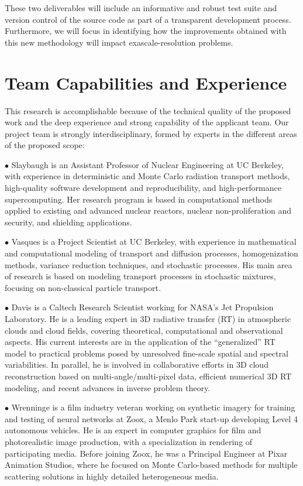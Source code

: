 \documentclass[12pt]{article}
\begin{document}
These two deliverables will include an informative and robust test suite and version control of the source code as part of a transparent development process.
Furthermore, we will focus in identifying how the improvements obtained with this new methodology will impact exascale-resolution problems.


\section{Team Capabilities and Experience}

This research is accomplishable because of the technical quality of the proposed work and the deep experience and strong capability of the applicant team.
Our project team is strongly interdisciplinary, formed by experts in the different areas of the proposed scope:

$\bullet$ Slaybaugh is an Assistant Professor of Nuclear Engineering at UC Berkeley, with experience in deterministic and Monte Carlo radiation transport methods, high-quality software development and reproducibility, and high-performance supercomputing.
Her research program is based in computational methods applied to existing and advanced nuclear reactors, nuclear non-proliferation and security, and shielding applications.

$\bullet$ Vasques is a Project Scientist at UC Berkeley, with experience in mathematical and computational modeling of transport and diffusion processes, homogenization methods, variance reduction techniques, and stochastic processes.
His main area of research is based on modeling transport processes in stochastic mixtures, focusing on non-classical particle transport.

$\bullet$ Davis is a Caltech Research Scientist working for NASA's Jet Propulsion Laboratory.
He is a leading expert in 3D radiative transfer (RT) in atmospheric clouds and cloud fields, covering theoretical, computational and observational aspects.
His current interests are in the application of the ``generalized'' RT model to practical problems posed by unresolved fine-scale spatial and spectral variabilities.
In parallel, he is involved in collaborative efforts in 3D cloud reconstruction based on multi-angle/multi-pixel data, efficient numerical 3D RT modeling, and recent advances in inverse problem theory.

$\bullet$ Wrenninge is a film industry veteran working on synthetic imagery for training and testing of neural networks at Zoox, a Menlo Park start-up developing Level 4 autonomous vehicles.
He is an expert in computer graphics for film and photorealistic image production, with a specialization in rendering of participating media.
Before joining Zoox, he was a Principal Engineer at Pixar Animation Studios, where he focused on Monte Carlo-based methods for multiple scattering solutions in highly detailed heterogeneous media.
\end{document}
